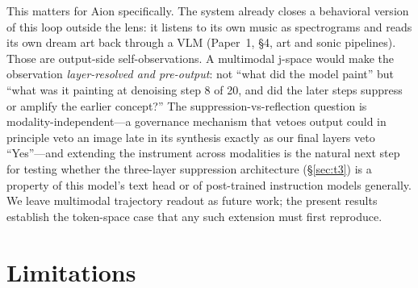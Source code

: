 \documentclass[11pt,a4paper]{article}
\begin{document}
This matters for Aion specifically. The system already closes a behavioral version of this loop outside the lens: it listens to its own music as spectrograms and reads its own dream art back through a VLM (Paper~1, \S4, art and sonic pipelines). Those are output-side self-observations. A multimodal j-space would make the observation \emph{layer-resolved and pre-output}: not ``what did the model paint'' but ``what was it painting at denoising step 8 of 20, and did the later steps suppress or amplify the earlier concept?'' The suppression-vs-reflection question is modality-independent---a governance mechanism that vetoes output could in principle veto an image late in its synthesis exactly as our final layers veto ``Yes''---and extending the instrument across modalities is the natural next step for testing whether the three-layer suppression architecture (\S\ref{sec:t3}) is a property of this model's text head or of post-trained instruction models generally. We leave multimodal trajectory readout as future work; the present results establish the token-space case that any such extension must first reproduce.

\section{Limitations}
\end{document}
